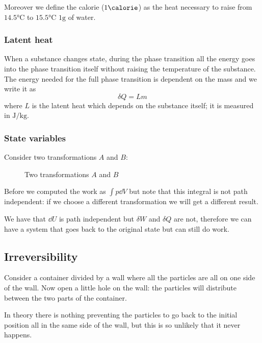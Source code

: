 \documentclass[14pt]{extarticle}
\begin{document}
Moreover we define the calorie ($1 \si{\calorie}$) as the heat necessary to raise from $14.5 \si{\celsius}$ to $15.5 \si{\celsius}$ $1 \si{\gram}$ of water.

\subsubsection{Latent heat}
When a substance changes state, during the phase transition all the energy goes into the phase transition itself without raising the temperature of the substance.
The energy needed for the full phase transition is dependent on the mass and we write it as
\begin{equation}
    \delta Q = L m
\end{equation}
where $L$ is the latent heat which depends on the substance itself; it is measured in $\si{\joule \per \kilogram}$.

\subsubsection{State variables}

Consider two transformations $A$ and $B$:
\begin{figure}[H]
    \centering
    {
        \virgil
        
    }
    \caption{Two transformations $A$ and $B$}
\end{figure}

Before we computed the work as $\int p \dd{V}$ but note that this integral is not path independent: if we choose a different transformation we will get a different result.

We have that $\dd{U}$ is path independent but $\delta W$ and $\delta Q$ are not, therefore we can have a system that goes back to the original state but can still do work.

\subsection{Irreversibility}

Consider a container divided by a wall where all the particles are all on one side of the wall. Now open a little hole on the wall: the particles will distribute between the two parts of the container.

In theory there is nothing preventing the particles to go back to the initial position all in the same side of the wall, but this is so unlikely that it never happens.
\end{document}
